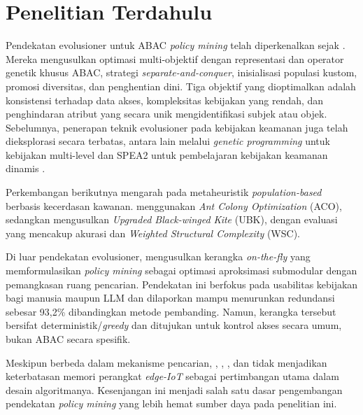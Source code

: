 \section{Penelitian Terdahulu}

Pendekatan evolusioner untuk ABAC \textit{policy mining} telah diperkenalkan sejak \textcite{gaspar-cunha_evolutionary_2015}.
Mereka mengusulkan optimasi multi-objektif dengan representasi dan operator genetik khusus ABAC, strategi \textit{separate-and-conquer}, inisialisasi populasi kustom, promosi diversitas, dan penghentian dini.
Tiga objektif yang dioptimalkan adalah konsistensi terhadap data akses, kompleksitas kebijakan yang rendah, dan penghindaran atribut yang secara unik mengidentifikasi subjek atau objek. 
Sebelumnya, penerapan teknik evolusioner pada kebijakan keamanan juga telah dieksplorasi secara terbatas, antara lain melalui \textit{genetic programming} untuk kebijakan multi-level \parencite{li_policy_2008} dan SPEA2\label{first:spea2} untuk pembelajaran kebijakan keamanan dinamis \parencite{lim_dynamic_2009,gaspar-cunha_evolutionary_2015}.

Perkembangan berikutnya mengarah pada metaheuristik \textit{population-based} berbasis kecerdasan kawanan. 
\textcite{shang_abac_2024} menggunakan \textit{Ant Colony Optimization} (ACO), sedangkan \textcite{li_attribute_2026} mengusulkan \textit{Upgraded Black-winged Kite} (UBK), dengan evaluasi yang mencakup akurasi dan \textit{Weighted Structural Complexity} (WSC).

Di luar pendekatan evolusioner, \textcite{guo_--fly_2025} mengusulkan kerangka \textit{on-the-fly} yang memformulasikan \textit{policy mining} sebagai optimasi aproksimasi submodular dengan pemangkasan ruang pencarian. 
Pendekatan ini berfokus pada usabilitas kebijakan bagi manusia maupun LLM\label{first:llm} dan dilaporkan mampu menurunkan redundansi sebesar 93,2\% dibandingkan metode pembanding. 
Namun, kerangka tersebut bersifat deterministik/\textit{greedy} dan ditujukan untuk kontrol akses secara umum, bukan ABAC secara spesifik.

Meskipun berbeda dalam mekanisme pencarian, \textcite{gaspar-cunha_evolutionary_2015}, \textcite{shang_abac_2024}, \textcite{li_attribute_2026}, dan \textcite{guo_--fly_2025} tidak menjadikan keterbatasan memori perangkat \textit{edge-IoT} sebagai pertimbangan utama dalam desain algoritmanya. 
Kesenjangan ini menjadi salah satu dasar pengembangan pendekatan \textit{policy mining} yang lebih hemat sumber daya pada penelitian ini.

